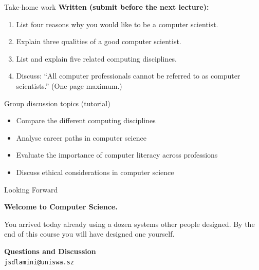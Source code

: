 \documentclass[aspectratio=169]{beamer}
\begin{document}
\begin{frame}{Take-home work}
  \textbf{Written (submit before the next lecture):}
  \begin{enumerate}
    \item List four reasons why you would like to be a computer scientist.
    \item Explain three qualities of a good computer scientist.
    \item List and explain five related computing disciplines.
    \item Discuss: ``All computer professionals cannot be referred to as
          computer scientists.'' (One page maximum.)
  \end{enumerate}
  \vspace{0.3cm}
  \begin{block}{Group discussion topics (tutorial)}
    \begin{itemize}
      \item Compare the different computing disciplines
      \item Analyse career paths in computer science
      \item Evaluate the importance of computer literacy across professions
      \item Discuss ethical considerations in computer science
    \end{itemize}
  \end{block}
\end{frame}

\begin{frame}{Looking Forward}
  \vspace{0.5cm}
  \begin{center}
    {\Large\textbf{Welcome to Computer Science.}}\\[0.6cm]
    \begin{minipage}{0.75\textwidth}
      \centering\small
      You arrived today already using a dozen systems other people designed.
      By the end of this course you will have designed one yourself.
    \end{minipage}
  \end{center}
  \vspace{0.8cm}
  \begin{center}
    \textbf{Questions and Discussion}\\[0.2cm]
    \small\texttt{jsdlamini@uniswa.sz}
  \end{center}
\end{frame}
\end{document}
